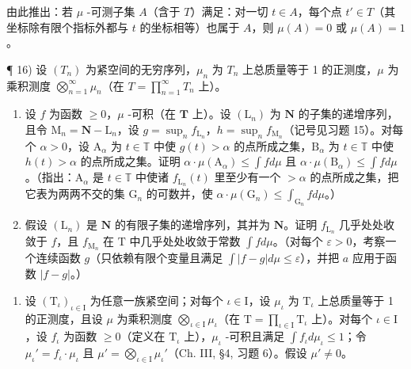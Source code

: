 由此推出：若 \(\mu\) -可测子集 \(A\)（含于 \(T\)）满足：对一切 \(t \in A\)，每个点 \(t' \in T\)（其坐标除有限个指标外都与 \(t\) 的坐标相等）也属于 \(A\)，则 \(\mu(A) = 0\) 或 \(\mu(A) = 1\)。

¶ 16) 设 \((T_n)\) 为紧空间的无穷序列，\(\mu_n\) 为 \(T_n\) 上总质量等于 1 的正测度，\(\mu\) 为乘积测度 \(\bigotimes_{n=1}^{\infty} \mu_n\)（在 \(T = \prod_{n=1}^{\infty} T_n\) 上）。

\begin{enumerate}
\def\labelenumi{\alph{enumi})}
\item
  设 \(f\) 为函数 \(\geqslant 0\)，\(\mu\) -可积（在 \(\mathbf{T}\) 上）。设 \((\mathrm{L}_n)\) 为 \(\mathbf{N}\) 的子集的递增序列，且令 \(\mathrm{M}_n = \mathbf{N} - \mathrm{L}_n\)，设 \(g = \sup_n f_{\mathrm{L}_n}\)，\(h = \sup_n f_{\mathrm{M}_n}\)（记号见习题 15）。对每个 \(\alpha > 0\)，设 \(\mathrm{A}_{\alpha}\) 为 \(t \in \mathbb{T}\) 中使 \(g(t) > \alpha\) 的点所成之集，\(\mathrm{B}_{\alpha}\) 为 \(t \in \mathbb{T}\) 中使 \(h(t) > \alpha\) 的点所成之集。证明 \(\alpha \cdot \mu(\mathrm{A}_{\alpha}) \leqslant \int f d\mu\) 且 \(\alpha \cdot \mu(\mathrm{B}_{\alpha}) \leqslant \int f d\mu\)。（指出：\(\mathrm{A}_{\alpha}\) 是 \(t \in \mathbb{T}\) 中使诸 \(f_{\mathrm{L}_n}(t)\) 里至少有一个 \(> \alpha\) 的点所成之集，把它表为两两不交的集 \(\mathrm{G}_n\) 的可数并，使 \(\alpha \cdot \mu(\mathrm{G}_n) \leqslant \int_{\mathrm{G}_n} f d\mu\)。）
\item
  假设 \((\mathrm{L}_n)\) 是 \(\mathbf{N}\) 的有限子集的递增序列，其并为 \(\mathbf{N}\)。证明 \(f_{\mathrm{L}_n}\) 几乎处处收敛于 \(f\)，且 \(f_{\mathrm{M}_n}\) 在 \(\mathrm{T}\) 中几乎处处收敛于常数 \(\int f d\mu\)。（对每个 \(\varepsilon > 0\)，考察一个连续函数 \(g\)（只依赖有限个变量且满足 \(\int |f - g| d\mu \leqslant \varepsilon\)），并把 \(a\) 应用于函数 \(|f - g|\)。）
\end{enumerate}

\begin{enumerate}
\def\labelenumi{\arabic{enumi})}
\setcounter{enumi}{16}
\tightlist
\item
  设 \((\mathrm{T}_{\iota})_{\iota \in \mathrm{I}}\) 为任意一族紧空间；对每个 \(\iota \in \mathrm{I}\)，设 \(\mu_{\iota}\) 为 \(\mathrm{T}_{\iota}\) 上总质量等于 1 的正测度，且设 \(\mu\) 为乘积测度 \(\bigotimes_{\iota \in \mathrm{I}} \mu_{\iota}\)（在 \(\mathrm{T} = \prod_{\iota \in \mathrm{I}} \mathrm{T}_{\iota}\) 上）。对每个 \(\iota \in \mathrm{I}\)，设 \(f_{\iota}\) 为函数 \(\geqslant 0\)（定义在 \(\mathrm{T}_{\iota}\) 上），\(\mu_{\iota}\) -可积且满足 \(\int f_{\iota} d\mu_{\iota} \leqslant 1\)；令 \(\mu_{\iota}' = f_{\iota} \cdot \mu_{\iota}\) 且 \(\mu' = \bigotimes_{\iota \in \mathrm{I}} \mu_{\iota}'\)（Ch. III, §4, 习题 6）。假设 \(\mu' \neq 0\)。
\end{enumerate}

